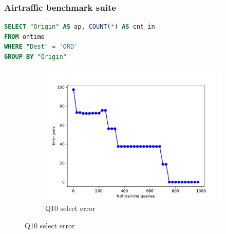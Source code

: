 \begin{frame}[fragile]
\frametitle{Airtraffic benchmark suite}
\begin{lstlisting}[basicstyle=\ttfamily\footnotesize, language=SQL]
SELECT "Origin" AS ap, COUNT(*) AS cnt_in
FROM ontime
WHERE "Dest" = 'ORD'
GROUP BY "Origin"
\end{lstlisting}
	\begin{figure}[!htb]
	  \begin{subfigure}[t]{0.5\textwidth}
	    \includegraphics[scale=0.4]{../figs/airtraffic/airtraffic_sel10_error.pdf}
	    \caption{Q10 select error}
	    \label{fig:sel04}
	  \end{subfigure}
	\end{figure}
\end{frame}


